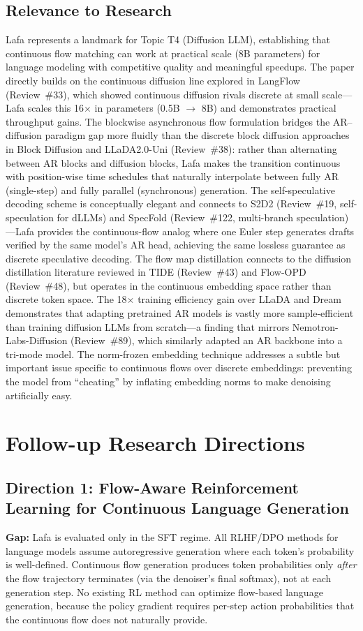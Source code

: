 \documentclass[11pt,a4paper]{article}
\begin{document}
\subsection{Relevance to Research}
Lafa represents a landmark for Topic T4 (Diffusion LLM), establishing that continuous flow matching can work at practical scale (8B parameters) for language modeling with competitive quality and meaningful speedups. The paper directly builds on the continuous diffusion line explored in LangFlow (Review~\#33), which showed continuous diffusion rivals discrete at small scale---Lafa scales this 16$\times$ in parameters (0.5B $\to$ 8B) and demonstrates practical throughput gains. The blockwise asynchronous flow formulation bridges the AR--diffusion paradigm gap more fluidly than the discrete block diffusion approaches in Block Diffusion and LLaDA2.0-Uni (Review~\#38): rather than alternating between AR blocks and diffusion blocks, Lafa makes the transition continuous with position-wise time schedules that naturally interpolate between fully AR (single-step) and fully parallel (synchronous) generation. The self-speculative decoding scheme is conceptually elegant and connects to S2D2 (Review~\#19, self-speculation for dLLMs) and SpecFold (Review~\#122, multi-branch speculation)---Lafa provides the continuous-flow analog where one Euler step generates drafts verified by the same model's AR head, achieving the same lossless guarantee as discrete speculative decoding. The flow map distillation connects to the diffusion distillation literature reviewed in TIDE (Review~\#43) and Flow-OPD (Review~\#48), but operates in the continuous embedding space rather than discrete token space. The 18$\times$ training efficiency gain over LLaDA and Dream demonstrates that adapting pretrained AR models is vastly more sample-efficient than training diffusion LLMs from scratch---a finding that mirrors Nemotron-Labs-Diffusion (Review~\#89), which similarly adapted an AR backbone into a tri-mode model. The norm-frozen embedding technique addresses a subtle but important issue specific to continuous flows over discrete embeddings: preventing the model from ``cheating'' by inflating embedding norms to make denoising artificially easy.

\section{Follow-up Research Directions}

\subsection{Direction 1: Flow-Aware Reinforcement Learning for Continuous Language Generation}
\textbf{Gap:} Lafa is evaluated only in the SFT regime. All RLHF/DPO methods for language models assume autoregressive generation where each token's probability is well-defined. Continuous flow generation produces token probabilities only \emph{after} the flow trajectory terminates (via the denoiser's final softmax), not at each generation step. No existing RL method can optimize flow-based language generation, because the policy gradient requires per-step action probabilities that the continuous flow does not naturally provide.
\end{document}
